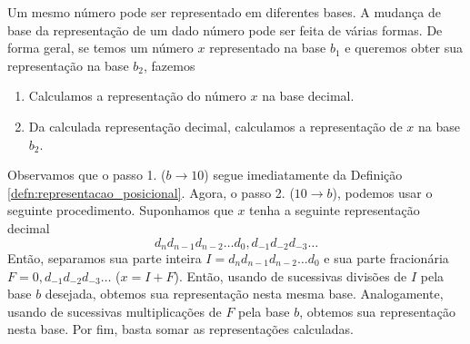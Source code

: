 Um mesmo número pode ser representado em diferentes bases. A mudança de base da representação de um dado número pode ser feita de várias formas. De forma geral, se temos um número $x$ representado na base $b_1$ e queremos obter sua representação na base $b_2$, fazemos
\begin{enumerate}
\item Calculamos a representação do número $x$ na base decimal.
\item Da calculada representação decimal, calculamos a representação de $x$ na base $b_2$.
\end{enumerate}
Observamos que o passo 1. ($b \to 10$) segue imediatamente da Definição \ref{defn:representacao_posicional}. Agora, o passo 2. ($10\to b$), podemos usar o seguinte procedimento. Suponhamos que $x$ tenha a seguinte representação decimal
\begin{equation}
  d_nd_{n-1}d_{n-2}\ldots d_0,d_{-1}d_{-2}d_{-3}\ldots
\end{equation}
Então, separamos sua parte inteira $I = d_nd_{n-1}d_{n-2}\ldots d_0$ e sua parte fracionária $F = 0,d_{-1}d_{-2}d_{-3}\ldots$ ($x = I + F$). Então, usando de sucessivas divisões de $I$ pela base $b$ desejada, obtemos sua representação nesta mesma base. Analogamente, usando de sucessivas multiplicações de $F$ pela base $b$, obtemos sua representação nesta base. Por fim, basta somar as representações calculadas.

